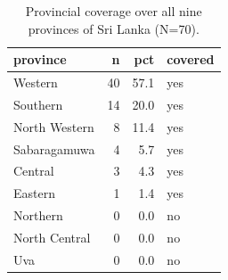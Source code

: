\begin{table}
\caption{Provincial coverage over all nine provinces of Sri Lanka (N=70).}
\label{tab:province_coverage}
\begin{tabular}{lrrl}
\toprule
province & n & pct & covered \\
\midrule
Western & 40 & 57.1 & yes \\
Southern & 14 & 20.0 & yes \\
North Western & 8 & 11.4 & yes \\
Sabaragamuwa & 4 & 5.7 & yes \\
Central & 3 & 4.3 & yes \\
Eastern & 1 & 1.4 & yes \\
Northern & 0 & 0.0 & no \\
North Central & 0 & 0.0 & no \\
Uva & 0 & 0.0 & no \\
\bottomrule
\end{tabular}
\end{table}
